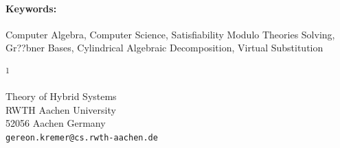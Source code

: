 \documentclass{article}
\newcommand{\ADDRESS}[2]{\noindent
  \textsuperscript{#1}\parbox[t]{0.9\textwidth}{#2} \vspace{6pt}}
\newcommand{\KEYWORDS}[1]{\paragraph{Keywords:} #1}
\newcommand{\MSCLASSIFICATION}[1]{\paragraph{Mathematics Subject Classification 2010:} #1}
\begin{document}

\KEYWORDS {Computer Algebra, Computer Science, Satisfiability Modulo Theories Solving, Gr??bner Bases, Cylindrical Algebraic Decomposition, Virtual Substitution}










\vspace{1cm}

\ADDRESS{1}{
Theory of Hybrid Systems  \\ RWTH Aachen University \\
52056 Aachen Germany \\
\texttt{gereon.kremer@cs.rwth-aachen.de}
}
\end{document}
